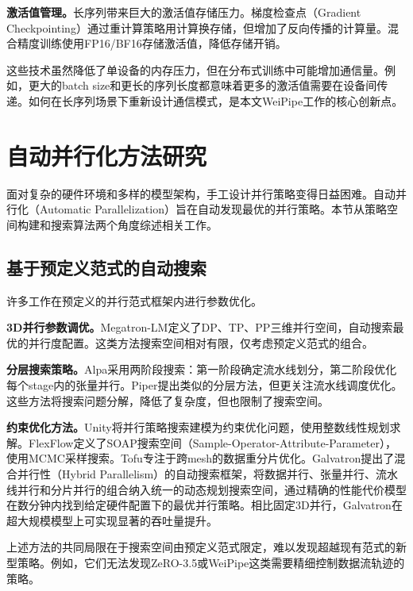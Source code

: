\textbf{激活值管理。}长序列带来巨大的激活值存储压力。梯度检查点（Gradient Checkpointing）\cite{chen2016training}通过重计算策略用计算换存储，但增加了反向传播的计算量。混合精度训练\cite{micikevicius2018mixed}使用FP16/BF16存储激活值，降低存储开销。

这些技术虽然降低了单设备的内存压力，但在分布式训练中可能增加通信量。例如，更大的batch size和更长的序列长度都意味着更多的激活值需要在设备间传递。如何在长序列场景下重新设计通信模式，是本文WeiPipe工作的核心创新点。

\section{自动并行化方法研究}

面对复杂的硬件环境和多样的模型架构，手工设计并行策略变得日益困难。自动并行化（Automatic Parallelization）旨在自动发现最优的并行策略。本节从策略空间构建和搜索算法两个角度综述相关工作。

\subsection{基于预定义范式的自动搜索}

许多工作在预定义的并行范式框架内进行参数优化。

\textbf{3D并行参数调优。}Megatron-LM\cite{shoeybi2019megatron,narayanan2021efficient}定义了DP、TP、PP三维并行空间，自动搜索最优的并行度配置。这类方法搜索空间相对有限，仅考虑预定义范式的组合。

\textbf{分层搜索策略。}Alpa\cite{zheng2022alpa}采用两阶段搜索：第一阶段确定流水线划分，第二阶段优化每个stage内的张量并行。Piper\cite{tarnawski2021piper}提出类似的分层方法，但更关注流水线调度优化。这些方法将搜索问题分解，降低了复杂度，但也限制了搜索空间。

\textbf{约束优化方法。}Unity\cite{unger2022unity}将并行策略搜索建模为约束优化问题，使用整数线性规划求解。FlexFlow\cite{jia2019flexflow}定义了SOAP搜索空间（Sample-Operator-Attribute-Parameter），使用MCMC采样搜索。Tofu\cite{zhuang2023optimizing}专注于跨mesh的数据重分片优化。Galvatron\cite{miao2023galvatron}提出了混合并行性（Hybrid Parallelism）的自动搜索框架，将数据并行、张量并行、流水线并行和分片并行的组合纳入统一的动态规划搜索空间，通过精确的性能代价模型在数分钟内找到给定硬件配置下的最优并行策略。相比固定3D并行，Galvatron在超大规模模型上可实现显著的吞吐量提升。

上述方法的共同局限在于搜索空间由预定义范式限定，难以发现超越现有范式的新型策略。例如，它们无法发现ZeRO-3.5或WeiPipe这类需要精细控制数据流轨迹的策略。

